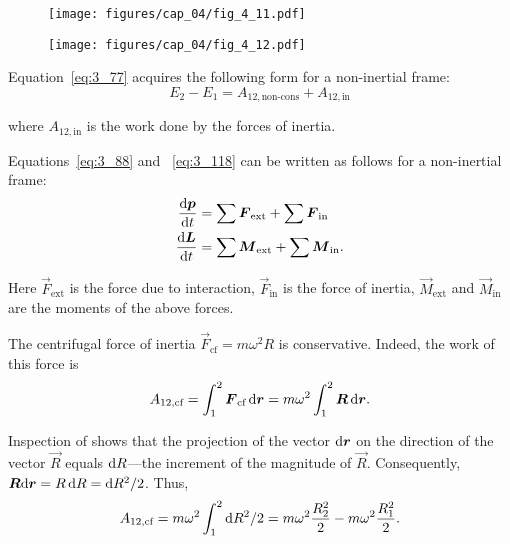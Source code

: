 \begin{figure}[t]
	\begin{minipage}[t]{0.5\linewidth}
		\begin{center}
			\texttt{[image: figures/cap\_04/fig\_4\_11.pdf]}
			\caption[]{}
			\label{fig:4_11}
		\end{center}
	\end{minipage}
	\hspace{-0.05cm}
	\begin{minipage}[t]{0.5\linewidth}
		\begin{center}
			\texttt{[image: figures/cap\_04/fig\_4\_12.pdf]}
			\caption[]{}
			\label{fig:4_12}
		\end{center}
	\end{minipage}
\end{figure}

Equation~\eqref{eq:3_77} acquires the following form for a non-inertial frame:
\begin{equation}\label{eq:4_26}
E_2-E_1 = A_{12,\text{non-cons}} + A_{12,\text{in}}
\end{equation}

\noindent
where $A_{12,\text{in}}$ is the work done by the forces of inertia.

Equations~\eqref{eq:3_88} and ~\eqref{eq:3_118} can be written as follows for a non-inertial frame:
\begin{align}
\frac{\mathrm{d}\boldsymbol{p}}{\mathrm{d} t} &= \sum\boldsymbol{F}_{\text{ext}} + \sum\boldsymbol{F}_{\text{in}}\label{eq:4_27}\\
\frac{\mathrm{d}\boldsymbol{L}}{\mathrm{d} t} &= \sum\boldsymbol{M}_{\text{ext}} + \sum\boldsymbol{M}_{\text{in}}\label{eq:4_28}.
\end{align}

Here $\vec{F}_{\text{ext}}$ is the force due to interaction, $\vec{F}_{\text{in}}$ is the force of inertia, $\vec{M}_{\text{ext}}$ and $\vec{M}_{\text{in}}$ are the moments of the above forces.

The centrifugal force of inertia $\vec{F}_{\text{cf}}=m\omega^2 R$ is conservative. Indeed, the work of this force is
\begin{equation*}
A_{12,\text{cf}} = \int_1^2\boldsymbol{F}_{\text{cf}}\,\mathrm{d}\boldsymbol{r} = m\omega^2\int_{1}^{2}\boldsymbol{R}\,\mathrm{d}\boldsymbol{r}.
\end{equation*}

\noindent
Inspection of  shows that the projection of the vector $\mathrm{d}\boldsymbol{r}$ on the direction of the vector $\vec{R}$ equals $\mathrm{d} R$---the increment of the magnitude of $\vec{R}$. Consequently, $\boldsymbol{R}\mathrm{d}\boldsymbol{r}=R\,\mathrm{d} R = \mathrm{d} R^2/2$. Thus,
\begin{equation}\label{eq:4_29}
A_{12,\text{cf}} = m\omega^2 \int_{1}^{2} \mathrm{d} R^2/2 = m\omega^2 \frac{R^2_2}{2} - m\omega^2 \frac{R^2_1}{2}.
\end{equation}


